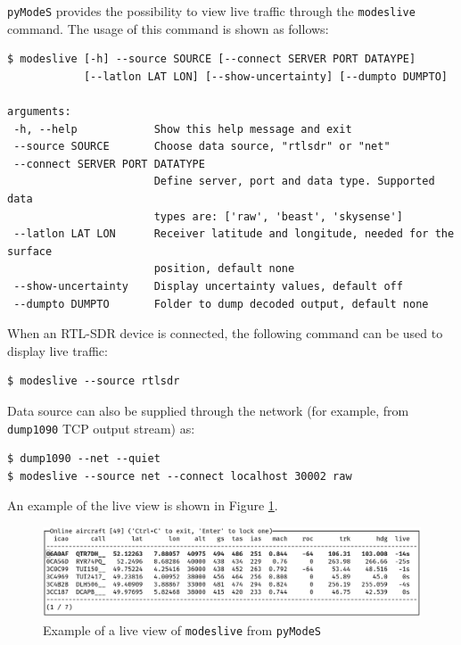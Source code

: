 \texttt{pyModeS} provides the possibility to view live traffic through the \texttt{modeslive} command. The usage of this command is shown as follows:

\begin{verbatim}
$ modeslive [-h] --source SOURCE [--connect SERVER PORT DATAYPE]
            [--latlon LAT LON] [--show-uncertainty] [--dumpto DUMPTO]

arguments:
 -h, --help            Show this help message and exit
 --source SOURCE       Choose data source, "rtlsdr" or "net"
 --connect SERVER PORT DATATYPE
                       Define server, port and data type. Supported data
                       types are: ['raw', 'beast', 'skysense']
 --latlon LAT LON      Receiver latitude and longitude, needed for the surface
                       position, default none
 --show-uncertainty    Display uncertainty values, default off
 --dumpto DUMPTO       Folder to dump decoded output, default none
\end{verbatim}

When an RTL-SDR device is connected, the following command can be used to display live traffic:

\begin{verbatim}
$ modeslive --source rtlsdr
\end{verbatim}

Data source can also be supplied through the network (for example, from \texttt{dump1090} TCP output stream) as:



\begin{verbatim}
$ dump1090 --net --quiet
$ modeslive --source net --connect localhost 30002 raw
\end{verbatim}

An example of the live view is shown in Figure \ref{fig:modeslive}.

\begin{figure}[ht]
  \centering
  \includegraphics[scale=0.3]{figures/quickstart/modeslive.png}
  \caption{Example of a live view of \texttt{modeslive} from \texttt{pyModeS}}
  \label{fig:modeslive}
\end{figure}

